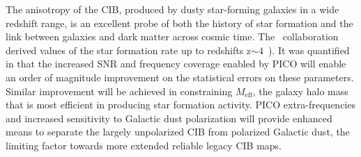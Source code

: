 \documentclass[PICOReport.tex]{subfiles}
\begin{document}
The anisotropy of the \ac{CIB}, produced by dusty star-forming galaxies in a wide redshift range, is an excellent probe of both the history of star formation and the link between
galaxies and dark matter across cosmic time. The \planck\ collaboration derived values of the star formation rate up to redshifts z$\mathrm{\sim 4}$~\cite{2014A&A...571A..30P,2014A&A...571A..18P,madau2014}).
It was quantified in \cite{Wu:2016hej} that the increased \ac{SNR} and frequency coverage enabled by PICO will enable an order of magnitude improvement on the statistical errors on these parameters.
Similar improvement will be achieved in constraining $M_{\mathrm{eff}}$, the galaxy halo mass that is most efficient in producing star formation activity. PICO extra-frequencies and increased sensitivity to Galactic dust polarization will provide enhanced means to separate the largely unpolarized \ac{CIB} from polarized Galactic dust, the limiting factor towards more extended reliable legacy \ac{CIB} maps.


\end{document}
